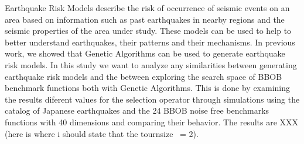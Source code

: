 Earthquake Risk Models describe the risk of occurrence of seismic
events on an area based on information such as past earthquakes
in nearby regions and the seismic properties of the area under study.
These models can be used to help to better understand earthquakes,
their patterns and their mechanisms. In previous work, we showed that Genetic Algorithms can be used to
generate earthquake risk models.
 In this study we want to analyze any similarities between generating earthquake risk models and the between exploring the search space of BBOB benchmark functions both with Genetic Algorithms. This is done by examining the results diferent values for the selection operator through simulations using the catalog of Japanese earthquakes and the 24 BBOB noise free benchmarks functions with 40 dimensions and comparing their behavior. The results are XXX (here is where i should state that the tournsize ~= 2).